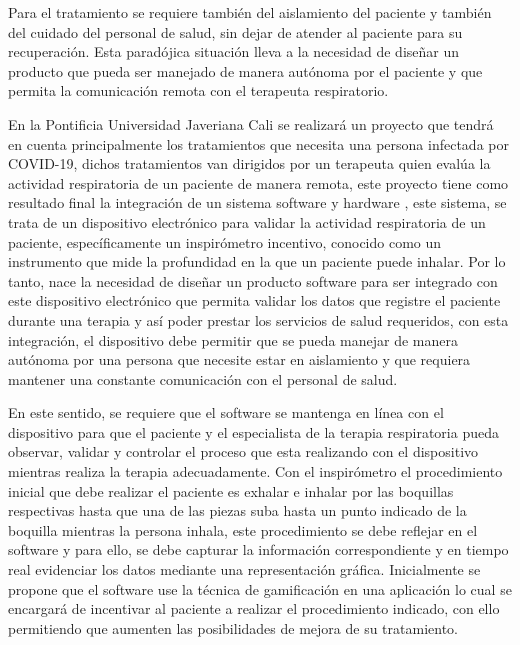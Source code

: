 Para el tratamiento se requiere tambi\'en del aislamiento del paciente y tambi\'en del cuidado del personal de salud, sin dejar de atender al paciente para su recuperaci\'on. Esta parad\'ojica situaci\'on lleva a la necesidad de dise\~{n}ar un producto que pueda ser manejado de manera aut\'onoma por el paciente y que permita la comunicaci\'on remota con el terapeuta respiratorio. 



En la Pontificia Universidad Javeriana Cali se realizar\'a un proyecto que tendr\'a en cuenta principalmente los tratamientos que necesita una persona infectada por COVID-19, dichos tratamientos van dirigidos por un terapeuta quien eval\'ua la actividad respiratoria de un paciente de manera remota, este proyecto tiene como resultado final la integraci\'on de un sistema software y hardware \cite{3}, este sistema, se trata de un dispositivo electr\'onico para validar la actividad respiratoria de un paciente, espec\'ificamente un inspir\'ometro incentivo, conocido como un instrumento que mide la profundidad en la que un paciente puede inhalar. Por lo tanto, nace la necesidad de dise\~{n}ar un producto software para ser integrado con este dispositivo electr\'onico que permita validar los datos que registre el paciente durante una terapia y as\'i poder prestar los servicios de salud requeridos, con esta integraci\'on, el dispositivo debe permitir que se pueda manejar de manera aut\'onoma por una persona que necesite estar en aislamiento y que requiera mantener una constante comunicaci\'on con el personal de salud.

En este sentido, se requiere que el software se mantenga en l\'inea con el dispositivo para que el paciente y el especialista de la terapia respiratoria pueda observar, validar y controlar el proceso que esta realizando con el dispositivo mientras realiza la terapia adecuadamente. Con el inspir\'ometro el procedimiento inicial que debe realizar el  paciente es exhalar e inhalar por las boquillas respectivas hasta que una de las piezas suba hasta un punto indicado de la boquilla mientras la persona inhala, este procedimiento se debe reflejar en el software y para ello, se debe capturar la informaci\'on correspondiente y en tiempo real evidenciar los datos mediante una representaci\'on gr\'afica. Inicialmente se propone que el software use la t\'ecnica de gamificaci\'on en una aplicaci\'on lo cual se encargar\'a de incentivar al paciente a realizar el procedimiento indicado, con ello permitiendo que aumenten las posibilidades de mejora de su tratamiento. 





